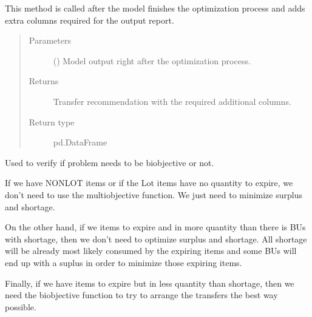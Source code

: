 \documentclass[letterpaper,10pt,english]{sphinxmanual}
\begin{document}
\begin{fulllineitems}
\begin{fulllineitems}
This method is called after the model finishes the optimization process and
adds extra columns required for the output report.
\begin{quote}\begin{description}
\item[{Parameters}] \leavevmode
{} (\sphinxstyleliteralemphasis{\sphinxupquote{{[}}}\sphinxstyleliteralemphasis{\sphinxupquote{{]}}}) \textendash{} Model output right after the optimization process.

\item[{Returns}] \leavevmode
Transfer recommendation with the required additional columns.

\item[{Return type}] \leavevmode
pd.DataFrame

\end{description}\end{quote}

\end{fulllineitems}


\begin{fulllineitems}
\label{\detokenize{source/optimization.model:optimization.model.optimizer.OptimizationModel._check_optimization_objective}}
Used to verify if problem needs to be bi\sphinxhyphen{}objective or not.

If we have NONLOT items or if the Lot items have no quantity to expire,
we don’t need to use the multi\sphinxhyphen{}objective function. We just need to
minimize surplus and shortage.

On the other hand, if we items to expire and in more quantity than there is
BUs with shortage, then we don’t need to optimize surplus and shortage. All
shortage will be already most likely consumed by the expiring items and some BUs
will end up with a suplus in order to minimize those expiring items.

Finally, if we have items to expire but in less quantity than shortage, then
we need the bi\sphinxhyphen{}objective function to try to arrange the transfers the best way possible.


\end{fulllineitems}
\end{fulllineitems}
\end{document}
